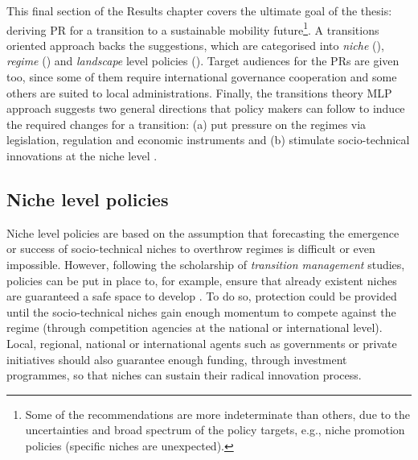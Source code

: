This final section of the Results chapter covers the ultimate goal of the thesis: deriving \gls{PR} for a transition to a sustainable mobility future\footnote{Some of the recommendations are more indeterminate than others, due to the uncertainties and broad spectrum of the policy targets, e.g., niche promotion policies (specific niches are unexpected).}. A transitions oriented approach backs the suggestions, which are categorised into \emph{niche} (), \emph{regime} () and \emph{landscape} level policies (). Target audiences for the \glspl{PR} are given too, since some of them require international governance cooperation and some others are suited to local administrations. Finally, the transitions theory MLP approach suggests two general directions that policy makers can follow to induce the required changes for a transition: (a) put pressure on the regimes via legislation, regulation and economic instruments and (b) stimulate socio-technical innovations at the niche level \parencite{kemp2007_Transitionmanagementas,geels2012_AutomobilityTransitionSocio}.

\subsection{Niche level policies}
\label{ss:results:policies_niche}
Niche level policies are based on the assumption that forecasting the emergence or success of socio-technical niches to overthrow regimes is difficult or even impossible. However, following the scholarship of \emph{transition management} studies, policies can be put in place to, for example, ensure that already existent niches are guaranteed a safe space to develop \parencite{kemp2011_TransitionManagementas}. To do so, protection could be provided until the socio-technical niches gain enough momentum to compete against the regime (through competition agencies at the national or international level). Local, regional, national or international agents such as governments or private initiatives should also guarantee enough funding, through investment programmes, so that niches can sustain their radical innovation process.

